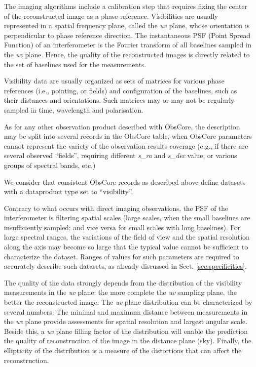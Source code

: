 \documentclass[11pt,a4paper]{ivoa}
\begin{document}
The imaging algorithms include a calibration step that requires fixing the
center of the reconstructed image as a phase reference. Visibilities
are usually represented in a spatial frequency plane, called the \emph{uv} plane,
whose orientation is perpendicular to phase reference direction. The instantaneous PSF
(Point Spread Function) of an interferometer is the Fourier transform of all baselines
sampled in the \emph{uv} plane. Hence, the quality of the reconstructed images is
directly related to the set of baselines used for the measurements.

Visibility data are usually organized as sets of matrices for various phase references
(i.e., pointing, or fields) and configuration of the baselines, such as their
distances and orientations. Such matrices may or may not be regularly sampled in time,
wavelength and polarisation.

As for any other observation product described with ObsCore, the description may be split into
several records in the ObsCore table, when ObsCore parameters cannot represent the
variety of the observation results coverage (e.g., if there are several observed ``fields'',
requiring different \emph{s\_ra} and \emph{s\_dec} value, or various groups of spectral bands, etc.)

We consider that consistent ObsCore records as described above define datasets with
a dataproduct type set to ``visibility''.

Contrary to what occurs with direct imaging observations, the PSF of the interferometer
is filtering spatial scales (large scales, when the small baselines are insufficiently
sampled; and vice versa for small scales with long baselines).
For large spectral ranges, the variations of the field of view and the spatial resolution
along the axis may become so large that the typical value cannot be sufficient to
characterize the dataset. Ranges of values for such parameters are required to accurately
describe such datasets, as already discussed in Sect. \ref{sec:specificities}.

The quality of the data strongly depends from the distribution of the visibility measurements
in the \emph{uv} plane: the more complete the \emph{uv} sampling plane, the better the reconstructed image.
The \emph{uv} plane distribution can be characterized by several numbers.
The minimal and maximum distance between measurements in the \emph{uv} plane provide assessments for
spatial resolution and largest angular scale.
Beside this, a \emph{uv} plane filling factor of the distribution will enable the prediction the quality
of reconstruction of the image in the distance plane (sky).
Finally, the ellipticity of the distribution is a measure of the distortions that can
affect the reconstruction.
\end{document}
